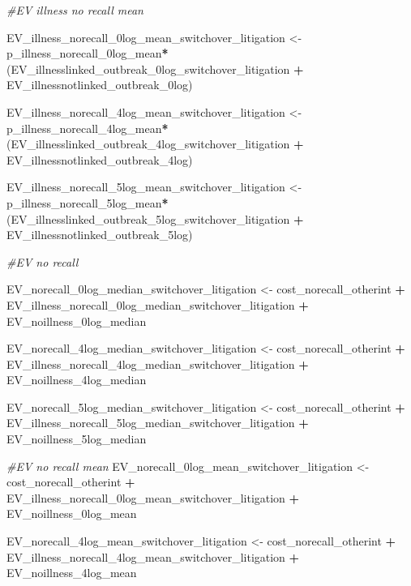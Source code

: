 \documentclass[
]{article}
\newenvironment{Shaded}{\begin{snugshade}}{\end{snugshade}}
\newcommand{\CommentTok}[1]{\textcolor[rgb]{0.56,0.35,0.01}{\textit{#1}}}
\newcommand{\NormalTok}[1]{#1}
\newcommand{\OtherTok}[1]{\textcolor[rgb]{0.56,0.35,0.01}{#1}}
\newcommand{\SpecialCharTok}[1]{\textcolor[rgb]{0.81,0.36,0.00}{\textbf{#1}}}
\begin{document}
\begin{Shaded}
\begin{Highlighting}[]
\CommentTok{\#EV illness no recall mean}

\NormalTok{EV\_illness\_norecall\_0log\_mean\_switchover\_litigation }\OtherTok{\textless{}{-}}\NormalTok{ p\_illness\_norecall\_0log\_mean}\SpecialCharTok{*}\NormalTok{(EV\_illnesslinked\_outbreak\_0log\_switchover\_litigation }\SpecialCharTok{+}\NormalTok{ EV\_illnessnotlinked\_outbreak\_0log)}

\NormalTok{EV\_illness\_norecall\_4log\_mean\_switchover\_litigation }\OtherTok{\textless{}{-}}\NormalTok{ p\_illness\_norecall\_4log\_mean}\SpecialCharTok{*}\NormalTok{(EV\_illnesslinked\_outbreak\_4log\_switchover\_litigation }\SpecialCharTok{+}\NormalTok{ EV\_illnessnotlinked\_outbreak\_4log)}

\NormalTok{EV\_illness\_norecall\_5log\_mean\_switchover\_litigation }\OtherTok{\textless{}{-}}\NormalTok{ p\_illness\_norecall\_5log\_mean}\SpecialCharTok{*}\NormalTok{(EV\_illnesslinked\_outbreak\_5log\_switchover\_litigation }\SpecialCharTok{+}\NormalTok{ EV\_illnessnotlinked\_outbreak\_5log)}

\CommentTok{\#EV no recall}

\NormalTok{EV\_norecall\_0log\_median\_switchover\_litigation }\OtherTok{\textless{}{-}}\NormalTok{ cost\_norecall\_otherint }\SpecialCharTok{+}\NormalTok{ EV\_illness\_norecall\_0log\_median\_switchover\_litigation }\SpecialCharTok{+}\NormalTok{ EV\_noillness\_0log\_median}

\NormalTok{EV\_norecall\_4log\_median\_switchover\_litigation }\OtherTok{\textless{}{-}}\NormalTok{ cost\_norecall\_otherint }\SpecialCharTok{+}\NormalTok{ EV\_illness\_norecall\_4log\_median\_switchover\_litigation }\SpecialCharTok{+}\NormalTok{ EV\_noillness\_4log\_median}

\NormalTok{EV\_norecall\_5log\_median\_switchover\_litigation }\OtherTok{\textless{}{-}}\NormalTok{ cost\_norecall\_otherint }\SpecialCharTok{+}\NormalTok{ EV\_illness\_norecall\_5log\_median\_switchover\_litigation }\SpecialCharTok{+}\NormalTok{ EV\_noillness\_5log\_median}

\CommentTok{\#EV no recall mean}
\NormalTok{EV\_norecall\_0log\_mean\_switchover\_litigation }\OtherTok{\textless{}{-}}\NormalTok{ cost\_norecall\_otherint }\SpecialCharTok{+}\NormalTok{ EV\_illness\_norecall\_0log\_mean\_switchover\_litigation }\SpecialCharTok{+}\NormalTok{ EV\_noillness\_0log\_mean}

\NormalTok{EV\_norecall\_4log\_mean\_switchover\_litigation }\OtherTok{\textless{}{-}}\NormalTok{ cost\_norecall\_otherint }\SpecialCharTok{+}\NormalTok{ EV\_illness\_norecall\_4log\_mean\_switchover\_litigation }\SpecialCharTok{+}\NormalTok{ EV\_noillness\_4log\_mean}


\end{Highlighting}
\end{Shaded}
\end{document}
